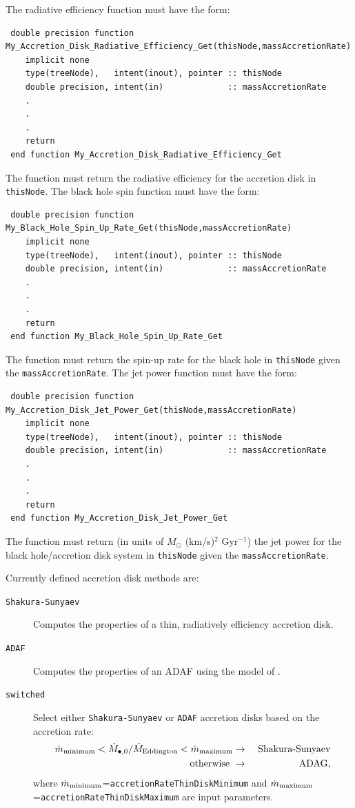 The radiative efficiency function must have the form:
\begin{verbatim}
 double precision function My_Accretion_Disk_Radiative_Efficiency_Get(thisNode,massAccretionRate)
    implicit none
    type(treeNode),   intent(inout), pointer :: thisNode
    double precision, intent(in)             :: massAccretionRate
    .
    .
    .
    return
 end function My_Accretion_Disk_Radiative_Efficiency_Get
\end{verbatim}
The function must return the radiative efficiency for the accretion disk in {\tt thisNode}. The black hole spin function must have the form:
\begin{verbatim}
 double precision function My_Black_Hole_Spin_Up_Rate_Get(thisNode,massAccretionRate)
    implicit none
    type(treeNode),   intent(inout), pointer :: thisNode
    double precision, intent(in)             :: massAccretionRate
    .
    .
    .
    return
 end function My_Black_Hole_Spin_Up_Rate_Get
\end{verbatim}
The function must return the spin-up rate for the black hole in {\tt thisNode} given the {\tt massAccretionRate}. The jet power function must have the form:
\begin{verbatim}
 double precision function My_Accretion_Disk_Jet_Power_Get(thisNode,massAccretionRate)
    implicit none
    type(treeNode),   intent(inout), pointer :: thisNode
    double precision, intent(in)             :: massAccretionRate
    .
    .
    .
    return
 end function My_Accretion_Disk_Jet_Power_Get
\end{verbatim}
The function must return (in units of $M_\odot$ (km/s)$^2$ Gyr$^{-1}$) the jet power for the black hole/accretion disk system in {\tt thisNode} given the {\tt massAccretionRate}.

Currently defined accretion disk methods are:
\begin{description}
 \item [{\tt Shakura-Sunyaev}] Computes the properties of a thin, radiatively efficiency accretion disk.
 \item [{\tt ADAF}] Computes the properties of an ADAF using the model of \cite{benson_maximum_2009}.
 \item [{\tt switched}] Select either {\tt Shakura-Sunyaev} or {\tt ADAF} accretion disks based on the accretion rate:
 \begin{eqnarray}
  \dot{m}_{\rm minimum} < \dot{M}_{\bullet, 0}/\dot{M}_{\rm Eddington} < \dot{m}_{\rm maximum} &\rightarrow& \hbox{ Shakura-Sunyaev} \nonumber \\
  \hbox{otherwise } &\rightarrow& \hbox{ ADAG},
 \end{eqnarray}
 where $\dot{m}_{\rm minimum}$={\tt accretionRateThinDiskMinimum} and $\dot{m}_{\rm maximum}$={\tt accretionRateThinDiskMaximum} are input parameters.
\end{description}

